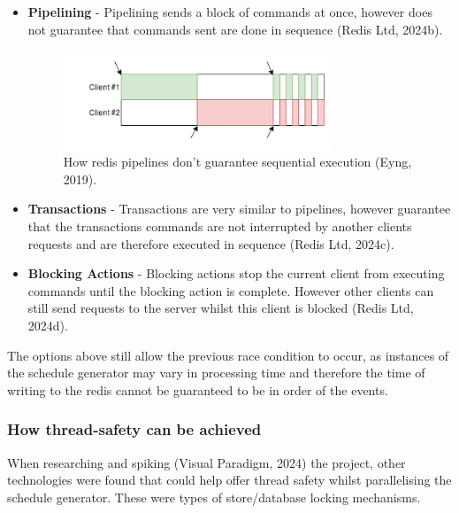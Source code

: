   \begin{itemize}
    \item \textbf{Pipelining} - Pipelining sends a block of commands at once, however does not guarantee that commands sent are done in sequence 
    (Redis Ltd, 2024b).
    \begin{figure}[H]
      \centering
      \includegraphics[width=8cm]{assets/pipelineOrdering.png}
      \caption{How redis pipelines don't guarantee sequential execution (Eyng, 2019).}
      \label{fig:pipelineOrdering}
    \end{figure}
    \item \textbf{Transactions} - Transactions are very similar to pipelines, however guarantee that the transactions commands are not interrupted by another
    clients requests and are therefore executed in sequence (Redis Ltd, 2024c).
    \item \textbf{Blocking Actions} - Blocking actions stop the current client from executing commands until the blocking action is complete. However other 
    clients can still send requests to the server whilst this client is blocked (Redis Ltd, 2024d). 
  \end{itemize}

  The options above still allow the previous race condition to occur, as instances of the schedule generator may vary in processing time and therefore the 
  time of writing to the redis cannot be guaranteed to be in order of the events.

  \subsubsection{How thread-safety can be achieved}
  When researching and spiking (Visual Paradigm, 2024) the project, other technologies were found that could help offer thread safety whilst parallelising
  the schedule generator. These were types of store/database locking mechanisms.


